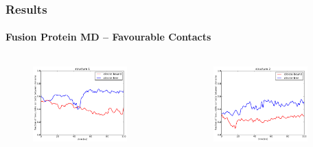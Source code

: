 \documentclass[english]{beamer}
\begin{document}
\begin{frame}
    \frametitle{Results}
    \framesubtitle{Fusion Protein MD -- Favourable Contacts}  

    \vspace{0.06\topmargin}

    \begin{columns}[t]
        \vspace{-4ex}
        \begin{figure}
            \includegraphics[width=0.85\textwidth]{figures/Complex_hydrophobic_core/favourable_cont_structure1.pdf}  
        \end{figure}      
        \vspace{-5ex}
        \begin{figure}
            \includegraphics[width=0.85\textwidth]{figures/Complex_hydrophobic_core/favourable_cont_structure3.pdf}  
        \end{figure}       


\end{columns}
\end{frame}
\end{document}
